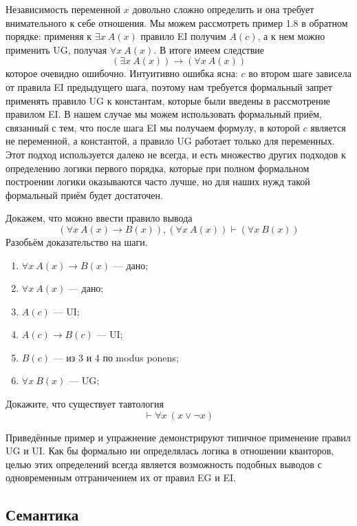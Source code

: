 Независимость переменной $x$ довольно сложно определить и она требует внимательного к себе отношения. Мы можем рассмотреть пример 1.8 в обратном порядке: применяя к $\exists x \ A(x)$ правило EI получим $A(c)$, а к нем можно применить UG, получая $\forall x\ A(x)$. В итоге имеем следствие
$$(\exists x\ A(x)) \to (\forall x\ A(x))$$
которое очевидно ошибочно. Интуитивно ошибка ясна: $c$ во втором шаге зависела от правила EI предыдущего шага, поэтому нам требуется формальный запрет применять правило UG к константам, которые были введены в рассмотрение правилом EI. В нашем случае мы можем использовать формальный приём, связанный с тем, что после шага EI мы получаем формулу, в которой $c$ является не переменной, а константой, а правило UG работает только для переменных. Этот подход используется далеко не всегда, и есть множество других подходов к определению логики первого порядка, которые при полном формальном построении логики оказываются часто лучше, но для наших нужд такой формальный приём будет достаточен.

\begin{example}
Докажем, что можно ввести правило вывода $$(\forall x\ A(x)\to B(x)), (\forall x\ A(x)) \vdash (\forall x\ B(x))$$
Разобьём доказательство на шаги.
\begin{enumerate}
\item $\forall x\ A(x) \to B(x)$ — дано;
\item $\forall x\ A(x)$ — дано;
\item $A(c)$ — UI;
\item $A(c) \to B(c)$ — UI;
\item $B(c)$ — из 3 и 4 по modus ponens;
\item $\forall x\ B(x)$ — UG;
\end{enumerate}
\end{example}

\begin{exercise}
Докажите, что существует тавтология $$\vdash \forall x\ (x\lor\neg x)$$
\end{exercise}

Приведённые пример и упражнение демонстрируют типичное применение правил UG и UI. Как бы формально ни определялась логика в отношении кванторов, целью этих определений всегда является возможность подобных выводов с одновременным отграничением их от правил EG и EI.

\subsection{Семантика}

